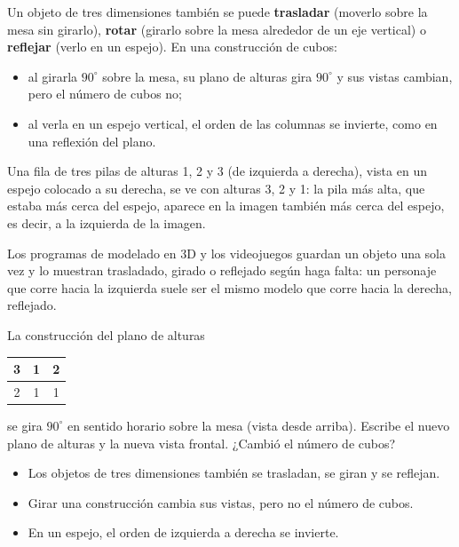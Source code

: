 \documentclass[11pt]{article}
\begin{document}
Un objeto de tres dimensiones también se puede \textbf{trasladar} (moverlo sobre la mesa sin
girarlo), \textbf{rotar} (girarlo sobre la mesa alrededor de un eje vertical) o
\textbf{reflejar} (verlo en un espejo). En una construcción de cubos:
\begin{itemize}
  \item al girarla $90^\circ$ sobre la mesa, su plano de alturas gira $90^\circ$ y sus vistas
        cambian, pero el número de cubos no;
  \item al verla en un espejo vertical, el orden de las columnas se invierte, como en una
        reflexión del plano.
\end{itemize}

\begin{ejemplo}
Una fila de tres pilas de alturas 1, 2 y 3 (de izquierda a derecha), vista en un espejo colocado
a su derecha, se ve con alturas 3, 2 y 1: la pila más alta, que estaba más cerca del espejo,
aparece en la imagen también más cerca del espejo, es decir, a la izquierda de la imagen.
\end{ejemplo}

\begin{aplicacion}
Los programas de modelado en 3D y los videojuegos guardan un objeto una sola vez y lo muestran
trasladado, girado o reflejado según haga falta: un personaje que corre hacia la izquierda suele
ser el mismo modelo que corre hacia la derecha, reflejado.
\end{aplicacion}

\begin{preguntas}
\pregunta La construcción del plano de alturas
\begin{center}
\renewcommand{\arraystretch}{1.3}
\begin{tabular}{|c|c|c|}\hline 3 & 1 & 2\\\hline 2 & 1 & 1\\\hline\end{tabular}
\end{center}
se gira $90^\circ$ en sentido horario sobre la mesa (vista desde arriba). Escribe el nuevo plano
de alturas y la nueva vista frontal. ¿Cambió el número de cubos?
\espacio{3.5cm}
\end{preguntas}

\begin{resumen}
\begin{itemize}
  \item Los objetos de tres dimensiones también se trasladan, se giran y se reflejan.
  \item Girar una construcción cambia sus vistas, pero no el número de cubos.
  \item En un espejo, el orden de izquierda a derecha se invierte.
\end{itemize}
\end{resumen}
\end{document}
